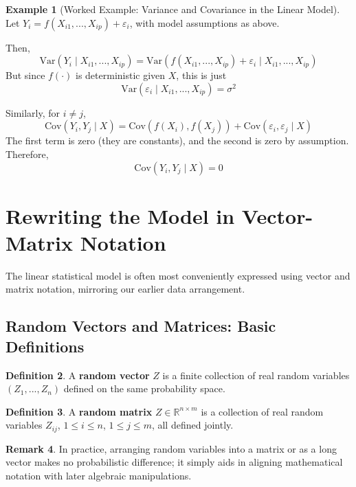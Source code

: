 \documentclass[11pt]{article}
\theoremstyle{definition}
\newtheorem{definition}{Definition}[section]
\theoremstyle{plain}
\theoremstyle{definition}
\newtheorem{example}[definition]{Example}
\newtheorem{remark}[definition]{Remark}
\begin{document}
\begin{example}[Worked Example: Variance and Covariance in the Linear Model]
Let $Y_i = f(X_{i1}, ..., X_{ip}) + \varepsilon_i$, with model assumptions as above.

Then,
\[
\mathrm{Var}(Y_i \mid X_{i1},..., X_{ip}) = \mathrm{Var}\left(f(X_{i1},..., X_{ip}) + \varepsilon_i \mid X_{i1}, ..., X_{ip}\right)
\]
But since $f(\cdot)$ is deterministic given $X$, this is just
\[
\mathrm{Var}(\varepsilon_i \mid X_{i1},..., X_{ip}) = \sigma^2
\]

Similarly, for $i \neq j$,
\[
\mathrm{Cov}(Y_i, Y_j \mid X) = \mathrm{Cov}(f(X_{i}), f(X_{j})) + \mathrm{Cov}(\varepsilon_i, \varepsilon_j \mid X)
\]
The first term is zero (they are constants), and the second is zero by assumption. Therefore,
\[
\mathrm{Cov}(Y_i, Y_j \mid X) = 0
\]
\end{example}

\section{Rewriting the Model in Vector-Matrix Notation}

The linear statistical model is often most conveniently expressed using vector and matrix notation, mirroring our earlier data arrangement.

\subsection{Random Vectors and Matrices: Basic Definitions}

\begin{definition}
A \textbf{random vector} $Z$ is a finite collection of real random variables $(Z_1, ..., Z_n)$ defined on the same probability space.
\end{definition}

\begin{definition}
A \textbf{random matrix} $Z \in \mathbb{R}^{n\times m}$ is a collection of real random variables $Z_{ij}$, $1 \leq i \leq n$, $1 \leq j \leq m$, all defined jointly.
\end{definition}

\begin{remark}
In practice, arranging random variables into a matrix or as a long vector makes no probabilistic difference; it simply aids in aligning mathematical notation with later algebraic manipulations.
\end{remark}
\end{document}
